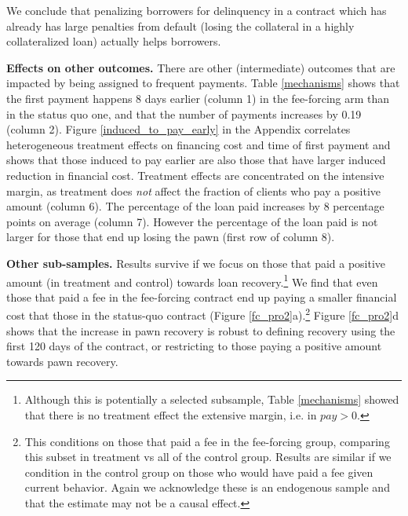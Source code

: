 \documentclass[oneside,11pt]{article}
\begin{document}

\vspace{.2in}
\noindent We conclude that penalizing borrowers for delinquency in a contract which has already has large penalties from default (losing the collateral in a highly collateralized loan) actually helps borrowers.

\vspace{.2in}
\noindent \textbf{Effects on other outcomes.} There are other (intermediate) outcomes that are impacted by being assigned to frequent payments. Table \ref{mechanisms} shows that the first payment happens 8 days earlier (column 1) in the fee-forcing arm than in the status quo one, and that the number of payments increases by 0.19 (column 2). Figure \ref{induced_to_pay_early} in the Appendix correlates heterogeneous treatment effects on financing cost and time of first payment and shows that those induced to pay earlier are also those that have larger induced reduction in financial cost. Treatment effects are concentrated on the intensive margin, as treatment does \textit{not} affect the fraction of clients who pay a positive amount (column 6). The percentage of the loan paid increases by 8 percentage points on average (column 7). However the percentage of the loan paid is not larger for those that end up losing the pawn (first row of column 8).

\vspace{.2in}
\noindent \textbf{Other sub-samples.}  Results survive if we focus on those that paid a positive amount (in treatment and control) towards loan recovery.\footnote{Although this is potentially a selected subsample, Table \ref{mechanisms} showed that there is no treatment effect the extensive margin, i.e. in $pay>0$.} We find that even those that paid a fee in the fee-forcing contract end up paying a smaller financial cost that those in the status-quo contract (Figure \ref{fc_pro2}a).\footnote{This conditions on those that paid a fee in the fee-forcing group, comparing this subset in treatment vs all of the control group. Results are similar if we condition in the control group on those who would have paid a fee given current behavior. Again we acknowledge these is an endogenous sample and that the estimate may not be a causal effect.}  Figure \ref{fc_pro2}d shows that the increase in pawn recovery is robust to defining recovery using the first 120 days of the contract, or restricting to those paying a positive amount towards pawn recovery.
\end{document}
